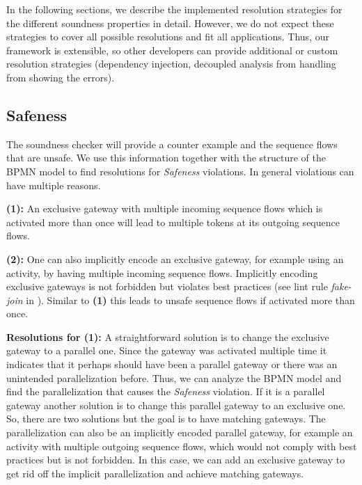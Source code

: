 \documentclass[runningheads]{llncs}
\begin{document}
In the following sections, we describe the implemented resolution strategies for the different soundness properties in detail.
However, we do not expect these strategies to cover all possible resolutions and fit all applications.
Thus, our framework is extensible, so other developers can provide additional or custom resolution strategies (dependency injection, decoupled analysis from handling from showing the errors).

\subsection{Safeness} \label{subsec:safeness}
The soundness checker will provide a counter example and the sequence flows that are unsafe.
We use this information together with the structure of the BPMN model to find resolutions for \textit{Safeness} violations.
In general violations can have multiple reasons.

\textbf{(1):} An exclusive gateway with multiple incoming sequence flows which is activated more than once will lead to multiple tokens at its outgoing sequence flows.

\textbf{(2):} One can also implicitly encode an exclusive gateway, for example using an activity, by having multiple incoming sequence flows.
Implicitly encoding exclusive gateways is not forbidden but violates best practices (see lint rule \textit{fake-join} in \cite{camundaservicesgmbhBpmnlint2024}).
Similar to \textbf{(1)} this leads to unsafe sequence flows if activated more than once.


\textbf{Resolutions for (1):} A straightforward solution is to change the exclusive gateway to a parallel one.
Since the gateway was activated multiple time it indicates that it perhaps should have been a parallel gateway or there was an unintended parallelization before.
Thus, we can analyze the BPMN model and find the parallelization that causes the \textit{Safeness} violation.
If it is a parallel gateway another solution is to change this parallel gateway to an exclusive one.
So, there are two solutions but the goal is to have matching gateways.
The parallelization can also be an implicitly encoded parallel gateway, for example an activity with multiple outgoing sequence flows, which would not comply with best practices but is not forbidden.
In this case, we can add an exclusive gateway to get rid off the implicit parallelization and achieve matching gateways.
\end{document}
